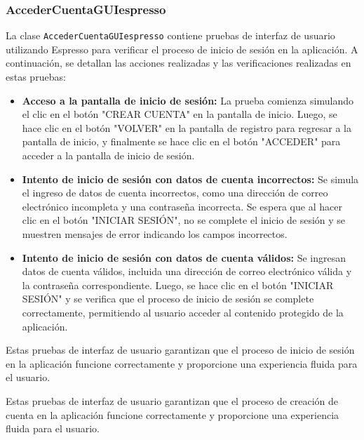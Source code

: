 \documentclass{article}
\begin{document}
\subsubsection{AccederCuentaGUIespresso}

La clase \texttt{AccederCuentaGUIespresso} contiene pruebas de interfaz de usuario utilizando Espresso para verificar el proceso de inicio de sesión en la aplicación. A continuación, se detallan las acciones realizadas y las verificaciones realizadas en estas pruebas:

\begin{itemize}
    \item \textbf{Acceso a la pantalla de inicio de sesión:} La prueba comienza simulando el clic en el botón "CREAR CUENTA" en la pantalla de inicio. Luego, se hace clic en el botón "VOLVER" en la pantalla de registro para regresar a la pantalla de inicio, y finalmente se hace clic en el botón "ACCEDER" para acceder a la pantalla de inicio de sesión.
    
    \item \textbf{Intento de inicio de sesión con datos de cuenta incorrectos:} Se simula el ingreso de datos de cuenta incorrectos, como una dirección de correo electrónico incompleta y una contraseña incorrecta. Se espera que al hacer clic en el botón "INICIAR SESIÓN", no se complete el inicio de sesión y se muestren mensajes de error indicando los campos incorrectos.
    
    \item \textbf{Intento de inicio de sesión con datos de cuenta válidos:} Se ingresan datos de cuenta válidos, incluida una dirección de correo electrónico válida y la contraseña correspondiente. Luego, se hace clic en el botón "INICIAR SESIÓN" y se verifica que el proceso de inicio de sesión se complete correctamente, permitiendo al usuario acceder al contenido protegido de la aplicación.
\end{itemize}

Estas pruebas de interfaz de usuario garantizan que el proceso de inicio de sesión en la aplicación funcione correctamente y proporcione una experiencia fluida para el usuario.



Estas pruebas de interfaz de usuario garantizan que el proceso de creación de cuenta en la aplicación funcione correctamente y proporcione una experiencia fluida para el usuario.
\end{document}
